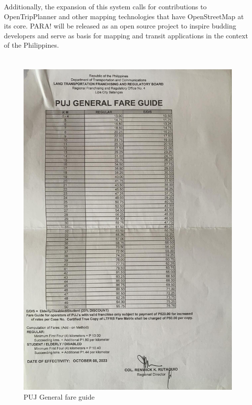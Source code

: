 \documentclass[journal]{./IEEE/IEEEtran}
\begin{document}
Additionally, the expansion of this system calls for contributions to OpenTripPlanner and other mapping technologies that have OpenStreetMap at its core. PARA! will be released as an open source project to inspire budding developers and serve as basis for mapping and transit applications in the context of the Philippines.


\newpage

\appendices

\section{}
\begin{figure}[!h]
    \centering
        \includegraphics[scale=0.14]{./figures/ltfrb/puj.jpeg}
    \caption{PUJ General fare guide}
\end{figure}
\end{document}
